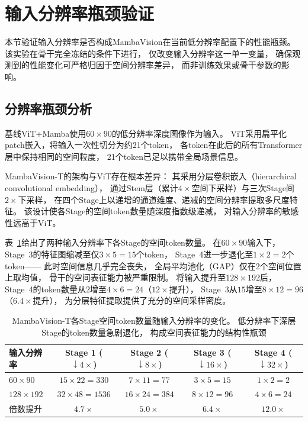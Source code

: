 \FloatBarrier


\section{输入分辨率瓶颈验证}
\label{sec:ch5_resolution}

本节验证输入分辨率是否构成MambaVision在当前低分辨率配置下的性能瓶颈。
该实验在骨干完全冻结的条件下进行，
仅改变输入分辨率这一单一变量，
确保观测到的性能变化可严格归因于空间分辨率差异，
而非训练效果或骨干参数的影响。

\subsection{分辨率瓶颈分析}

基线ViT+Mamba使用$60\times90$的低分辨率深度图像作为输入。
ViT采用扁平化patch嵌入，将输入一次性切分为约21个token，
各token在此后的所有Transformer层中保持相同的空间粒度，
21个token已足以携带全局场景信息。

MambaVision-T\cite{Hatamizadeh2025MambaVisionCVPR}的架构与ViT存在根本差异：
其采用分层卷积嵌入（hierarchical convolutional embedding），
通过Stem层（累计$4\times$空间下采样）与三次Stage间$2\times$下采样，
在四个Stage上以递增的通道维度、递减的空间分辨率提取多尺度特征。
该设计使各Stage的空间token数量随深度指数级递减，
对输入分辨率的敏感性远高于ViT。

表~\ref{tab:ch5_token_analysis}给出了两种输入分辨率下各Stage的空间token数量。
在$60\times90$输入下，
Stage~3的特征图缩减至仅$3\times5=15$个token，
Stage~4进一步退化至$1\times2=2$个token——
此时空间信息几乎完全丧失，
全局平均池化（GAP）仅在2个空间位置上取均值，
骨干的空间表征能力被严重限制。
将输入提升至$128\times192$后，
Stage~4的token数量从$2$增至$4\times6=24$（$12\times$提升），
Stage~3从$15$增至$8\times12=96$（$6.4\times$提升），
为分层特征提取提供了充分的空间采样密度。

\begin{table}[htbp]
\centering
\caption{MambaVision-T各Stage空间token数量随输入分辨率的变化。
低分辨率下深层Stage的token数量急剧退化，
构成空间表征能力的结构性瓶颈}
\label{tab:ch5_token_analysis}
\begin{tabular}{lcccc}
\toprule
\textbf{输入分辨率} & \textbf{Stage 1} ($\downarrow4\times$) & \textbf{Stage 2} ($\downarrow8\times$) & \textbf{Stage 3} ($\downarrow16\times$) & \textbf{Stage 4} ($\downarrow32\times$) \\
\midrule
$60\times90$   & $15\times22=330$  & $7\times11=77$   & $3\times5=15$    & $1\times2=2$ \\
$128\times192$ & $32\times48=1536$ & $16\times24=384$ & $8\times12=96$   & $4\times6=24$ \\
\midrule
倍数提升       & $4.7\times$       & $5.0\times$      & $6.4\times$      & $12.0\times$ \\
\bottomrule
\end{tabular}
\end{table}

